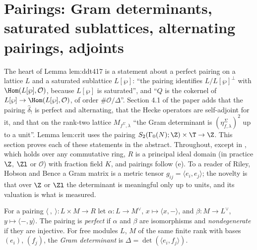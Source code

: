 \section[Pairings]{Pairings: Gram determinants, saturated sublattices, alternating pairings, adjoints}\label{sec:modules:pairings}

The heart of Lemma lem:ddt417 is a statement about a perfect pairing on a lattice $L$ and a saturated sublattice $L[\wp]$: ``the pairing
identifies $L/L[\wp]^\perp$ with $\Hom(L[\wp],\mathcal O)$, because $L[\wp]$ is saturated'', and ``$Q$ is the cokernel of $L[\wp]\to\Hom(L[\wp],\mathcal O)$, of
order $\#\mathcal O/\Delta$''. Section 4.1 of the paper adds that the pairing $\hat\delta_!$ is perfect and alternating, that the Hecke operators are
self-adjoint for it, and that on the rank-two lattice $M_{f^\Sigma,\lambda}$ ``the Gram determinant is $(\eta^\Sigma_{f,\lambda})^2$ up to a unit''. Lemma lem:crit
uses the pairing $S_2(\Gamma_0(N);\Z)\times\T\to\Z$. This section proves each of these statements in the abstract. Throughout, except in , which holds over any commutative ring, $R$ is a principal
ideal domain (in practice $\Z$, $\Zl$ or $\mathcal O$) with fraction field $K$, and pairings follow (e). To a reader of Riley,
Hobson and Bence a Gram matrix is a metric tensor $g_{ij}=\langle e_i,e_j\rangle$; the novelty is that over $\Z$ or $\Zl$ the determinant is meaningful
only up to units, and its valuation is what is measured.

\begin{definition}\label{def:modules:pairing}
For a pairing $\langle\ ,\ \rangle\colon L\times M\to R$ let $\alpha\colon L\to M^\vee$, $x\mapsto\langle x,-\rangle$, and $\beta\colon M\to L^\vee$, $y\mapsto\langle-,y\rangle$. The pairing is
\emph{perfect} if $\alpha$ and $\beta$ are isomorphisms and \emph{nondegenerate} if they are injective. For free modules $L$, $M$ of the same finite rank
with bases $(e_i)$, $(f_j)$, the \emph{Gram determinant} is $\Delta=\det(\langle e_i,f_j\rangle)$.
\end{definition}

